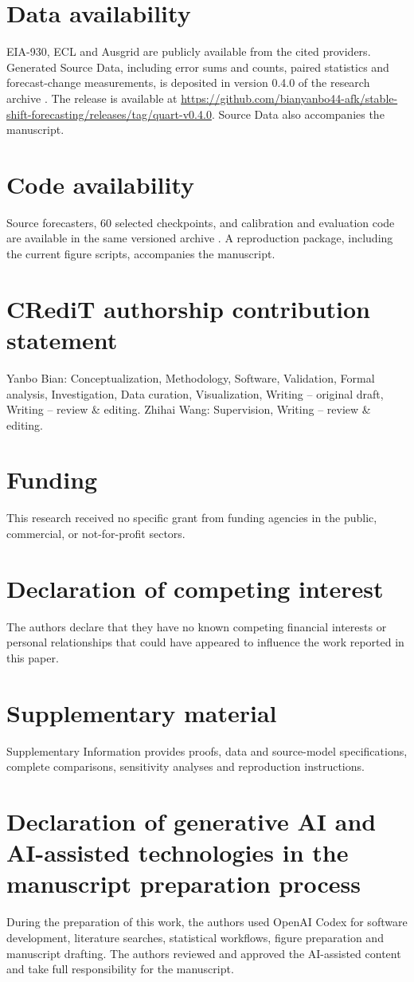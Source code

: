 \documentclass[preprint,12pt,times,nonatbib]{elsarticle}
\begin{document}
\section*{Data availability}
EIA-930, ECL and Ausgrid are publicly available from the cited providers. Generated Source Data, including error sums and counts, paired statistics and forecast-change measurements, is deposited in version 0.4.0 of the research archive \parencite{qorc2026materials}. The release is available at \url{https://github.com/bianyanbo44-afk/stable-shift-forecasting/releases/tag/quart-v0.4.0}. Source Data also accompanies the manuscript.
\section*{Code availability}
Source forecasters, 60 selected checkpoints, and calibration and evaluation code are available in the same versioned archive \parencite{qorc2026materials}. A reproduction package, including the current figure scripts, accompanies the manuscript.
\section*{CRediT authorship contribution statement}
Yanbo Bian: Conceptualization, Methodology, Software, Validation, Formal analysis, Investigation, Data curation, Visualization, Writing -- original draft, Writing -- review \& editing. Zhihai Wang: Supervision, Writing -- review \& editing.
\section*{Funding}
This research received no specific grant from funding agencies in the public, commercial, or not-for-profit sectors.
\section*{Declaration of competing interest}
The authors declare that they have no known competing financial interests or personal relationships that could have appeared to influence the work reported in this paper.
\section*{Supplementary material}
Supplementary Information provides proofs, data and source-model specifications, complete comparisons, sensitivity analyses and reproduction instructions.
\section*{Declaration of generative AI and AI-assisted technologies in the manuscript preparation process}
During the preparation of this work, the authors used OpenAI Codex for software development, literature searches, statistical workflows, figure preparation and manuscript drafting. The authors reviewed and approved the AI-assisted content and take full responsibility for the manuscript.
\renewcommand{\bibfont}{\fontsize{10}{12}\selectfont}
\setlength{\bibitemsep}{2pt}
\clearpage
\printbibliography
\end{document}
